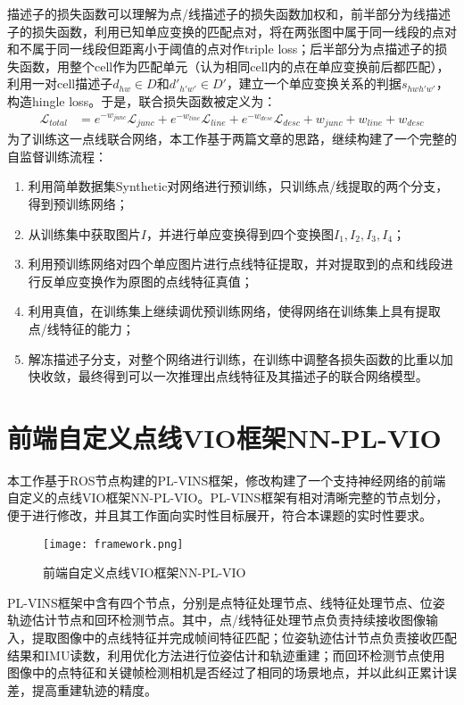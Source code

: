 描述子的损失函数可以理解为点/线描述子的损失函数加权和，前半部分为线描述子的损失函数，利用已知单应变换的匹配点对，将在两张图中属于同一线段的点对和不属于同一线段但距离小于阈值的点对作triple loss；后半部分为点描述子的损失函数，用整个cell作为匹配单元（认为相同cell内的点在单应变换前后都匹配），利用一对cell描述子$d_{hw}\in D$和$d'_{h'w'}\in D'$，建立一个单应变换关系的判据$s_{hwh'w'}$，构造hingle loss。于是，联合损失函数被定义为：
\[
  \begin{aligned}\mathcal{L}_{total}&=e^{-w_{junc}}\mathcal{L}_{junc}+e^{-w_{line}}\mathcal{L}_{line}+e^{-w_{desc}}\mathcal{L}_{desc}+w_{junc}+w_{line}+w_{desc}\end{aligned}
\]
为了训练这一点线联合网络，本工作基于两篇文章的思路，继续构建了一个完整的自监督训练流程：
\begin{enumerate}
  \item 利用简单数据集Synthetic对网络进行预训练，只训练点/线提取的两个分支，得到预训练网络；
  \item 从训练集中获取图片$I$，并进行单应变换得到四个变换图$I_1, I_2, I_3, I_4$；
  \item 利用预训练网络对四个单应图片进行点线特征提取，并对提取到的点和线段进行反单应变换作为原图的点线特征真值；
  \item 利用真值，在训练集上继续调优预训练网络，使得网络在训练集上具有提取点/线特征的能力；
  \item 解冻描述子分支，对整个网络进行训练，在训练中调整各损失函数的比重以加快收敛，最终得到可以一次推理出点线特征及其描述子的联合网络模型。
\end{enumerate}

\section{前端自定义点线VIO框架NN-PL-VIO}
本工作基于ROS节点构建的PL-VINS框架，修改构建了一个支持神经网络的前端自定义的点线VIO框架NN-PL-VIO。PL-VINS框架有相对清晰完整的节点划分，便于进行修改，并且其工作面向实时性目标展开，符合本课题的实时性要求。
\begin{figure}
  \centering
  \texttt{[image: framework.png]}
  \caption{前端自定义点线VIO框架NN-PL-VIO}
  \label{fig_framework}
\end{figure}
PL-VINS框架中含有四个节点，分别是点特征处理节点、线特征处理节点、位姿轨迹估计节点和回环检测节点。其中，点/线特征处理节点负责持续接收图像输入，提取图像中的点线特征并完成帧间特征匹配；位姿轨迹估计节点负责接收匹配结果和IMU读数，利用优化方法进行位姿估计和轨迹重建；而回环检测节点使用图像中的点特征和关键帧检测相机是否经过了相同的场景地点，并以此纠正累计误差，提高重建轨迹的精度。

